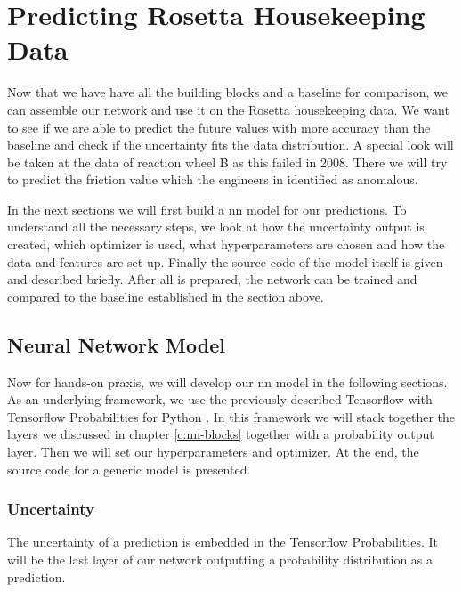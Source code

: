 \section{Predicting Rosetta Housekeeping Data}
Now that we have have all the building blocks and a baseline for comparison, we can assemble our network and use it on the Rosetta housekeeping data. We want to see if we are able to predict the future values with more accuracy than the baseline and check if the uncertainty fits the data distribution. A special look will be taken at the data of reaction wheel B as this failed in 2008. There we will try to predict the friction value which the engineers in \cite{rosetta-maintenance} identified as anomalous.

In the next sections we will first build a \ac{nn} model for our predictions. To understand all the necessary steps, we look at how the uncertainty output is created, which optimizer is used, what hyperparameters are chosen and how the data and features are set up. Finally the source code of the model itself is given and described briefly. \newline
After all is prepared, the network can be trained and compared to the baseline established in the section above.

	\subsection{Neural Network Model}
	Now for hands-on praxis, we will develop our \ac{nn} model in the following sections. \newline
	As an underlying framework, we use the previously described Tensorflow with Tensorflow Probabilities for Python \cite{tf-web}. In this framework we will stack together the layers we discussed in chapter \ref{c:nn-blocks} together with a probability output layer. Then we will set our hyperparameters and optimizer. At the end, the source code for a generic model is presented.	
	
		\subsubsection{Uncertainty}
		The uncertainty of a prediction is embedded in the Tensorflow Probabilities. It will be the last layer of our network outputting a probability distribution as a prediction. 
		
